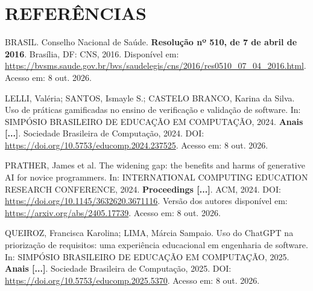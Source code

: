 \section*{\centering REFERÊNCIAS}
\begin{singlespace}\setlength{\parindent}{0pt}\setlength{\parskip}{0.7em}
BRASIL. Conselho Nacional de Saúde. \textbf{Resolução nº 510, de 7 de abril de 2016}. Brasília, DF: CNS, 2016. Disponível em: \url{https://bvsms.saude.gov.br/bvs/saudelegis/cns/2016/res0510_07_04_2016.html}. Acesso em: 8 out. 2026.

LELLI, Valéria; SANTOS, Ismayle S.; CASTELO BRANCO, Karina da Silva. Uso de práticas gamificadas no ensino de verificação e validação de software. In: SIMPÓSIO BRASILEIRO DE EDUCAÇÃO EM COMPUTAÇÃO, 2024. \textbf{Anais [...]}. Sociedade Brasileira de Computação, 2024. DOI: \url{https://doi.org/10.5753/educomp.2024.237525}. Acesso em: 8 out. 2026.

PRATHER, James et al. The widening gap: the benefits and harms of generative AI for novice programmers. In: INTERNATIONAL COMPUTING EDUCATION RESEARCH CONFERENCE, 2024. \textbf{Proceedings [...]}. ACM, 2024. DOI: \url{https://doi.org/10.1145/3632620.3671116}. Versão dos autores disponível em: \url{https://arxiv.org/abs/2405.17739}. Acesso em: 8 out. 2026.

QUEIROZ, Francisca Karolina; LIMA, Márcia Sampaio. Uso do ChatGPT na priorização de requisitos: uma experiência educacional em engenharia de software. In: SIMPÓSIO BRASILEIRO DE EDUCAÇÃO EM COMPUTAÇÃO, 2025. \textbf{Anais [...]}. Sociedade Brasileira de Computação, 2025. DOI: \url{https://doi.org/10.5753/educomp.2025.5370}. Acesso em: 8 out. 2026.
\end{singlespace}
